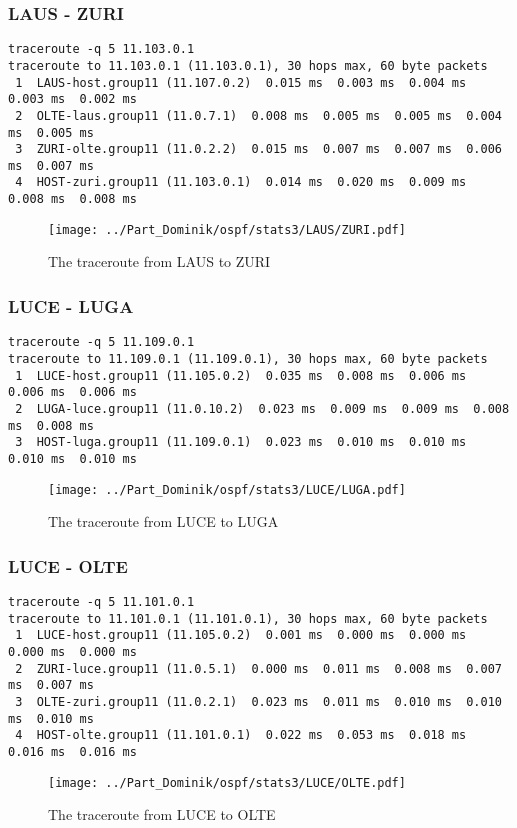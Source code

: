 \subsubsection{LAUS - ZURI}
\begin{lstlisting}
traceroute -q 5 11.103.0.1
traceroute to 11.103.0.1 (11.103.0.1), 30 hops max, 60 byte packets
 1  LAUS-host.group11 (11.107.0.2)  0.015 ms  0.003 ms  0.004 ms  0.003 ms  0.002 ms
 2  OLTE-laus.group11 (11.0.7.1)  0.008 ms  0.005 ms  0.005 ms  0.004 ms  0.005 ms
 3  ZURI-olte.group11 (11.0.2.2)  0.015 ms  0.007 ms  0.007 ms  0.006 ms  0.007 ms
 4  HOST-zuri.group11 (11.103.0.1)  0.014 ms  0.020 ms  0.009 ms  0.008 ms  0.008 ms
\end{lstlisting}
\begin{figure}[H]
\centering
\texttt{[image: ../Part\_Dominik/ospf/stats3/LAUS/ZURI.pdf]}
\caption{The traceroute from LAUS to ZURI}
\end{figure}
\clearpage
\subsubsection{LUCE - LUGA}
\begin{lstlisting}
traceroute -q 5 11.109.0.1
traceroute to 11.109.0.1 (11.109.0.1), 30 hops max, 60 byte packets
 1  LUCE-host.group11 (11.105.0.2)  0.035 ms  0.008 ms  0.006 ms  0.006 ms  0.006 ms
 2  LUGA-luce.group11 (11.0.10.2)  0.023 ms  0.009 ms  0.009 ms  0.008 ms  0.008 ms
 3  HOST-luga.group11 (11.109.0.1)  0.023 ms  0.010 ms  0.010 ms  0.010 ms  0.010 ms
\end{lstlisting}
\begin{figure}[H]
\centering
\texttt{[image: ../Part\_Dominik/ospf/stats3/LUCE/LUGA.pdf]}
\caption{The traceroute from LUCE to LUGA}
\end{figure}
\clearpage
\subsubsection{LUCE - OLTE}
\begin{lstlisting}
traceroute -q 5 11.101.0.1
traceroute to 11.101.0.1 (11.101.0.1), 30 hops max, 60 byte packets
 1  LUCE-host.group11 (11.105.0.2)  0.001 ms  0.000 ms  0.000 ms  0.000 ms  0.000 ms
 2  ZURI-luce.group11 (11.0.5.1)  0.000 ms  0.011 ms  0.008 ms  0.007 ms  0.007 ms
 3  OLTE-zuri.group11 (11.0.2.1)  0.023 ms  0.011 ms  0.010 ms  0.010 ms  0.010 ms
 4  HOST-olte.group11 (11.101.0.1)  0.022 ms  0.053 ms  0.018 ms  0.016 ms  0.016 ms
\end{lstlisting}
\begin{figure}[H]
\centering
\texttt{[image: ../Part\_Dominik/ospf/stats3/LUCE/OLTE.pdf]}
\caption{The traceroute from LUCE to OLTE}
\end{figure}
\clearpage
